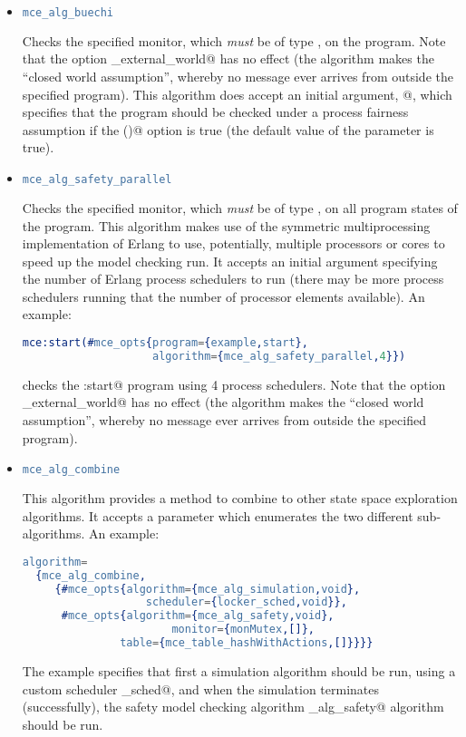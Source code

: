 \documentclass[a4paper]{article}
\begin{document}
\begin{itemize}
\item
\begin{lstlisting}[language=Erlang]
mce_alg_buechi
\end{lstlisting}
Checks the specified monitor, which {\em must} be of type \lstinline@buechi@,
on the program. 
Note that the option \lstinline@sim_external_world@
has no effect (the algorithm makes the ``closed world assumption'',
whereby no message ever arrives from outside the specified program).
This algorithm does accept an initial argument,
@, which specifies that the
program should be checked
under a process fairness assumption if the \lstinline@bool()@
option is true (the default value of the parameter is true).

\item
\begin{lstlisting}[language=Erlang]
mce_alg_safety_parallel
\end{lstlisting}
Checks the specified monitor, which {\em must} be of type \lstinline@safety@,
on all program states of the program.
This algorithm makes use of the symmetric multiprocessing implementation
of Erlang to use, potentially, multiple processors or cores
to speed up the model checking run.
It accepts an initial argument specifying the number
of Erlang process schedulers to run (there may be more process
schedulers running that the number of processor elements available).
An example:
\begin{lstlisting}[language=Erlang]
mce:start(#mce_opts{program={example,start},
                    algorithm={mce_alg_safety_parallel,4}})
\end{lstlisting}
checks the \lstinline@example:start@ program using 4 process
schedulers.
Note that the option \lstinline@sim_external_world@
has no effect (the algorithm makes the ``closed world assumption'',
whereby no message ever arrives from outside the specified program).
\item
\label{mce_alg_combine}
\begin{lstlisting}[language=Erlang]
mce_alg_combine
\end{lstlisting}
This algorithm provides a method to combine to other state space
exploration algorithms. It accepts a parameter which enumerates
the two different sub-algorithms. An example:
\begin{lstlisting}[language=Erlang]
algorithm=
  {mce_alg_combine,
     {#mce_opts{algorithm={mce_alg_simulation,void},
		           scheduler={locker_sched,void}},
      #mce_opts{algorithm={mce_alg_safety,void},
	                   monitor={monMutex,[]},
			   table={mce_table_hashWithActions,[]}}}}
\end{lstlisting}
The example specifies that first a simulation algorithm should be run,
using a custom scheduler \lstinline@locker_sched@, and when the simulation
terminates (successfully), the safety model checking algorithm 
\lstinline@mce_alg_safety@ algorithm should be run.


\end{itemize}
\end{document}
